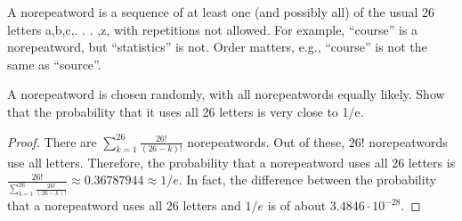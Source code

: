 \begin{exercise}{42}
    A norepeatword is a sequence of at least one (and possibly all) of the usual 26 letters
a,b,c,. . . ,z, with repetitions not allowed. For example, “course” is a norepeatword, but
“statistics” is not. Order matters, e.g., “course” is not the same as “source”.

A norepeatword is chosen randomly, with all norepeatwords equally likely. Show that
the probability that it uses all 26 letters is very close to 1/e.
\end{exercise}

\begin{proof}
    There are $\sum_{k=1}^{26} \frac{26!}{(26-k)!}$ norepeatwords. Out of these, $26!$ norepeatwords use all letters. Therefore, the probability that a norepeatword uses all 26 letters is $\frac{26!}{\sum_{k=1}^{26} \frac{26!}{(26-k)!}} \approx 0.36787944 \approx 1/e$. In fact, the difference between the probability that a norepeatword uses all 26 letters and $1/e$ is of about $3.4846 \cdot 10^{-28}$.
\end{proof}


